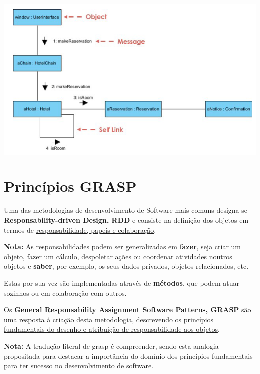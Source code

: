 \documentclass{article}
\begin{document}
\begin{center}
    \includegraphics[scale=0.4]{Images/9.png}
\end{center}

\section{Princípios GRASP}

Uma das metodologias de desenvolvimento de Software mais comuns designa-se
\textbf{Responsability-driven Design, RDD} e consiste na definição dos objetos
em termos de \uline{responsabilidade, papeis e colaboração}.

\begin{flushleft}
    \textbf{Nota:} As responsabilidades podem ser generalizadas em \textbf{fazer}, seja criar um objeto, fazer um cálculo,
    despoletar ações ou coordenar atividades noutros objetos e \textbf{saber}, por exemplo, os seus dados privados,
    objetos relacionados, etc.
\end{flushleft}

Estas por sua vez são implementadas através de \textbf{métodos}, que podem atuar
sozinhos ou em colaboração com outros.

Os  \textbf{General Responsability Assignment Software Patterns, GRASP} são uma
resposta à criação desta metodologia, \uline{descrevendo os princípios fundamentais do desenho
e atribuição de responsabilidade aos objetos}.

\begin{flushleft}
    \textbf{Nota:} A tradução literal de grasp é compreender, sendo esta analogia propositada para destacar a importância
    do domínio dos princípios fundamentais para ter sucesso no desenvolvimento de software.
\end{flushleft}
\end{document}
